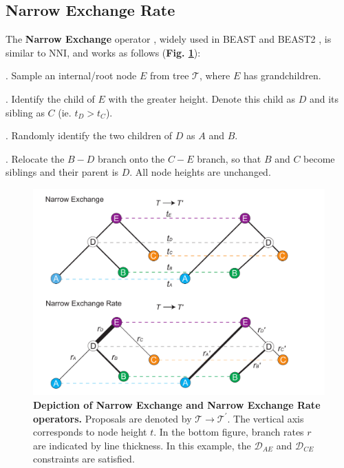 \documentclass[10pt,letterpaper]{article}
\begin{document}
\subsection*{Narrow Exchange Rate} \label{sect:NER}

The \textbf{Narrow Exchange} operator \cite{drummond2002estimating}, widely used in BEAST \cite{drummond2012bayesian} and BEAST2 \cite{bouckaert2019beast}, is similar to NNI, and works as follows (\textbf{Fig. \ref{fig:narrowexchange}}):

. Sample an internal/root node $E$ from tree $\mathcal{T}$, where $E$ has grandchildren.

. Identify the child of $E$ with the greater height. Denote this child as $D$ and its sibling as $C$ (ie. $t_D > t_C$).

. Randomly identify the two children of $D$ as $A$ and $B$.

. Relocate the $B-D$ branch onto the $C-E$ branch, so that $B$ and $C$ become siblings and their parent is $D$. All node heights are unchanged.


\begin{figure}[!h]
\includegraphics[width=\textwidth]{Figures/NarrowExchange.pdf}
\caption{\textbf{Depiction of Narrow Exchange and Narrow Exchange Rate operators.} Proposals are denoted by $\mathcal{T} \rightarrow \mathcal{T}^\prime$. The vertical axis corresponds to node height $t$. In the bottom figure, branch rates $r$ are indicated by line thickness. In this example, the $\mathcal{D}_{AE}$ and $\mathcal{D}_{CE}$ constraints are satisfied.}
\label{fig:narrowexchange}
\end{figure}
\end{document}
